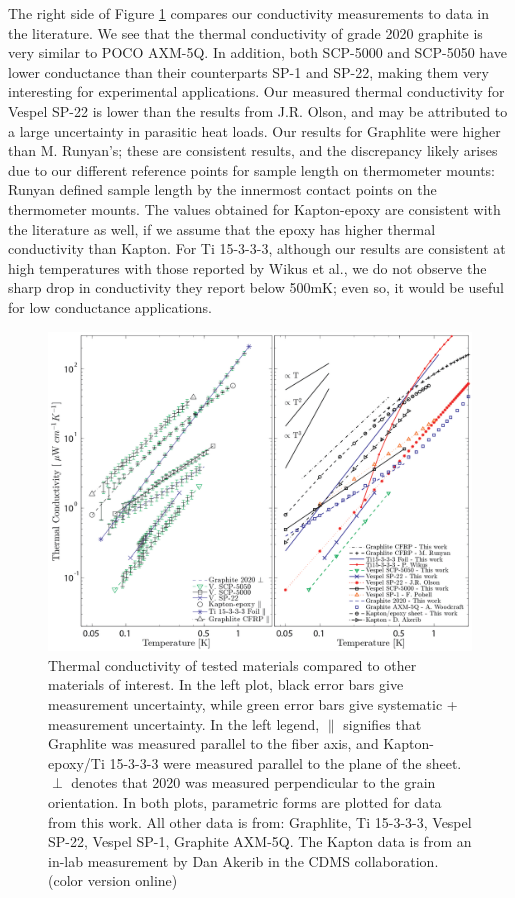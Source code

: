\documentclass[final]{svjour2}
\begin{document}
The right side of Figure \ref{plots} compares our conductivity measurements to data in the literature. We see that the thermal conductivity of grade 2020 graphite is very similar to POCO AXM-5Q. In addition, both SCP-5000 and SCP-5050 have lower conductance than their counterparts SP-1 and SP-22, making them very interesting for experimental applications. Our measured thermal conductivity for Vespel SP-22 is lower than the results from J.R. Olson\cite{Olson1993}, and may be attributed to a large uncertainty in parasitic heat loads. Our results for Graphlite were higher than M. Runyan's\cite{Runyan2008}; these are consistent results, and the discrepancy likely arises due to our different reference points for sample length on thermometer mounts: Runyan defined sample length by the innermost contact points on the thermometer mounts.  The values obtained for Kapton-epoxy are consistent with the literature as well, if we assume that the epoxy has higher thermal conductivity than Kapton. For Ti 15-3-3-3, although our results are consistent at high temperatures with those reported by Wikus et al.\cite{Wikus2010}, we do not observe the sharp drop in conductivity they report below 500mK; even so, it would be useful for low conductance applications.

\begin{figure}[h]
\includegraphics[width = \textwidth]{double_plot_v3.png}
\caption{{\small Thermal conductivity of tested materials compared to other materials of interest. In the left plot, black error bars give measurement uncertainty, while green error bars give systematic + measurement uncertainty. In the left legend, $\parallel$ signifies that Graphlite was measured parallel to the fiber axis, and Kapton-epoxy/Ti 15-3-3-3 were measured parallel to the plane of the sheet. $\perp$ denotes that 2020 was measured perpendicular to the grain orientation. In both plots, parametric forms are plotted for data from this work. All other data is from: Graphlite\cite{Runyan2008}, Ti 15-3-3-3\cite{Wikus2010}, Vespel SP-22\cite{Olson1993}, Vespel SP-1\cite{Pobell1992}, Graphite AXM-5Q\cite{Woodcraft2009}. The Kapton data is from an in-lab measurement by Dan Akerib in the CDMS collaboration. (color version online)}}
\label{plots}
\end{figure}
\end{document}
